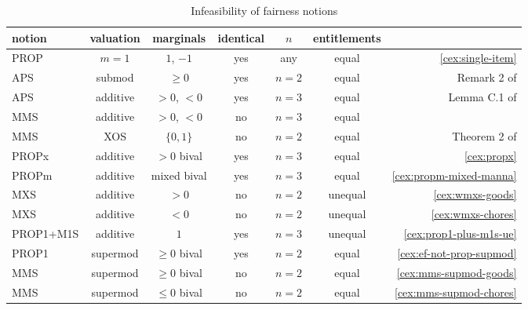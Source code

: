 \begin{table}[htb]
\centering
\caption{Infeasibility of fairness notions}
\label{table:infeas}
\begin{tabular}{lcccccr}
\toprule \scriptsize notion & \scriptsize valuation & \scriptsize marginals & \scriptsize identical & \scriptsize $n$ & \scriptsize entitlements &
\\ \midrule PROP & $m=1$ & $1$, $-1$ & yes & any & equal
    & \cref{cex:single-item}
\\[\defaultaddspace] APS & submod & $\ge 0$ & yes & $n=2$ & equal
    & Remark 2 of \cite{babaioff2023fair}
\\[\defaultaddspace] APS & additive & $> 0$, $< 0$ & yes & $n=3$ & equal
    & Lemma C.1 of \cite{babaioff2023fair}
\\[\defaultaddspace] MMS & additive & $> 0$, $< 0$ & no & $n=3$ & equal
    & \cite{feige2022tight}
\\[\defaultaddspace] MMS & XOS & $\{0, 1\}$ & no & $n=2$ & equal
    & Theorem 2 of \cite{barman2021existence}
\\[\defaultaddspace] PROPx & additive & $> 0$ bival & yes & $n=3$ & equal
    & \cref{cex:propx}
\\[\defaultaddspace] PROPm & additive & mixed bival & yes & $n=3$ & equal
    & \cref{cex:propm-mixed-manna}
\\[\defaultaddspace] MXS & additive & $> 0$ & no & $n=2$ & unequal
    & \cref{cex:wmxs-goods}
\\[\defaultaddspace] MXS & additive & $< 0$ & no & $n=2$ & unequal
    & \cref{cex:wmxs-chores}
\\[\defaultaddspace] PROP1+M1S & additive & $1$ & yes & $n=3$ & unequal
    & \cref{cex:prop1-plus-m1s-ue}
\\[\defaultaddspace] PROP1 & supermod & $\ge 0$ bival & yes & $n=2$ & equal
    & \cref{cex:ef-not-prop-supmod}
\\[\defaultaddspace] MMS & supermod & $\ge 0$ bival & no & $n=2$ & equal
    & \cref{cex:mms-supmod-goods}
\\[\defaultaddspace] MMS & supermod & $\le 0$ bival & no & $n=2$ & equal
    & \cref{cex:mms-supmod-chores}
\\ \bottomrule
\end{tabular}
\end{table}

